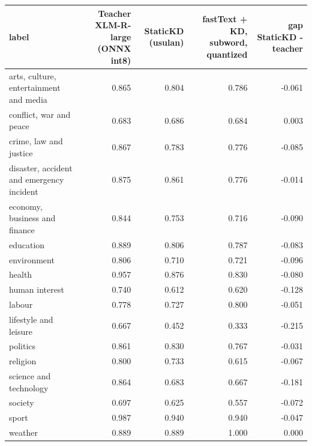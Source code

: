 \begin{tabular}{lrrrr}
\toprule
label & Teacher XLM-R-large (ONNX int8) & StaticKD (usulan) & fastText + KD, subword, quantized & gap StaticKD - teacher \\
\midrule
arts, culture, entertainment and media & 0.865 & 0.804 & 0.786 & -0.061 \\
conflict, war and peace & 0.683 & 0.686 & 0.684 & 0.003 \\
crime, law and justice & 0.867 & 0.783 & 0.776 & -0.085 \\
disaster, accident and emergency incident & 0.875 & 0.861 & 0.776 & -0.014 \\
economy, business and finance & 0.844 & 0.753 & 0.716 & -0.090 \\
education & 0.889 & 0.806 & 0.787 & -0.083 \\
environment & 0.806 & 0.710 & 0.721 & -0.096 \\
health & 0.957 & 0.876 & 0.830 & -0.080 \\
human interest & 0.740 & 0.612 & 0.620 & -0.128 \\
labour & 0.778 & 0.727 & 0.800 & -0.051 \\
lifestyle and leisure & 0.667 & 0.452 & 0.333 & -0.215 \\
politics & 0.861 & 0.830 & 0.767 & -0.031 \\
religion & 0.800 & 0.733 & 0.615 & -0.067 \\
science and technology & 0.864 & 0.683 & 0.667 & -0.181 \\
society & 0.697 & 0.625 & 0.557 & -0.072 \\
sport & 0.987 & 0.940 & 0.940 & -0.047 \\
weather & 0.889 & 0.889 & 1.000 & 0.000 \\
\bottomrule
\end{tabular}
